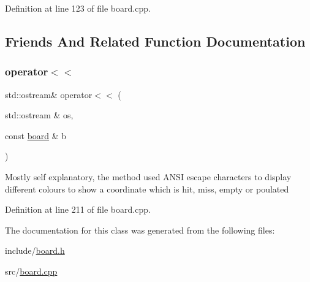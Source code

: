 Definition at line 123 of file board.\+cpp.



\subsection{Friends And Related Function Documentation}
\mbox{\label{classbattle__ship_1_1board_a1a31fc970cf43cac6d5b1a44e3831f5d}} 
\subsubsection{\texorpdfstring{operator$<$$<$}{operator<<}}
{\footnotesize\ttfamily std\+::ostream\& operator$<$$<$ (\begin{DoxyParamCaption}\item[{std\+::ostream \&}]{os,  }\item[{const \hyperlink{classbattle__ship_1_1board}{board} \&}]{b }\end{DoxyParamCaption})\hspace{0.3cm}{\ttfamily [friend]}}

Mostly self explanatory, the method used A\+N\+SI escape characters to display different colours to show a coordinate which is hit, miss, empty or poulated 

Definition at line 211 of file board.\+cpp.



The documentation for this class was generated from the following files\+:\begin{DoxyCompactItemize}
\item 
include/\hyperlink{board_8h}{board.\+h}\item 
src/\hyperlink{board_8cpp}{board.\+cpp}\end{DoxyCompactItemize}
